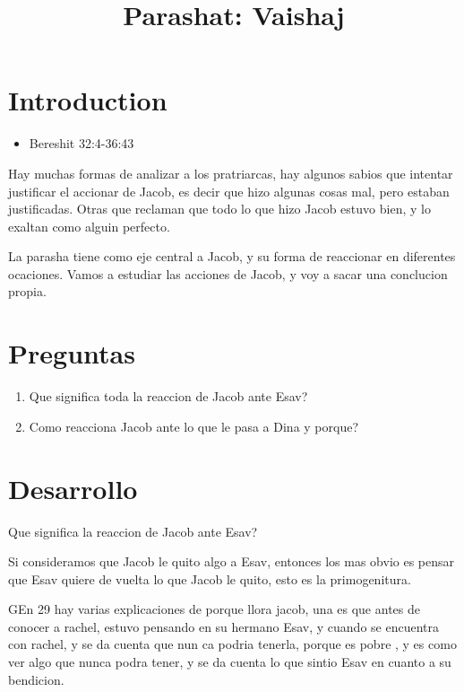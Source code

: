 \documentclass[conference]{IEEEtran}
\title{Parashat: Vaishaj\\ \textit{}}
\author{\IEEEauthorblockN{Kunst, James Jules Waldemar}
\IEEEauthorblockA{Bet-Melej Haba}}
\begin{document}
\maketitle


\section{Introduction}
\begin{itemize}
\item
Bereshit 32:4-36:43
\end{itemize}


Hay muchas formas de analizar a los pratriarcas,
hay algunos sabios que intentar justificar el accionar de Jacob, es decir que hizo algunas cosas mal, pero estaban justificadas.
Otras que reclaman que todo lo que hizo Jacob estuvo bien, y lo exaltan como alguin perfecto.




La parasha tiene como eje central a Jacob, y su forma de reaccionar en diferentes ocaciones.
Vamos a estudiar las acciones de Jacob, y voy a sacar una conclucion propia. 





\section{Preguntas}

\begin{enumerate}
\item Que significa toda la reaccion de Jacob ante Esav?
\item Como reacciona Jacob ante lo que le pasa a Dina y porque?
\end{enumerate}



\section{Desarrollo}

\item 
Que significa la reaccion de Jacob ante Esav?

Si consideramos que Jacob le quito algo a Esav, entonces los mas obvio es pensar que Esav quiere de vuelta lo que 
Jacob le quito, esto es la primogenitura.



GEn 29
hay varias explicaciones de porque llora jacob, una es que antes de conocer a rachel, estuvo pensando en su hermano Esav, y cuando se encuentra con rachel, y se da cuenta que nun ca podria tenerla, porque es pobre , y es como ver algo que nunca podra tener, y se da cuenta lo que sintio Esav en cuanto a su bendicion. 
\end{document}
